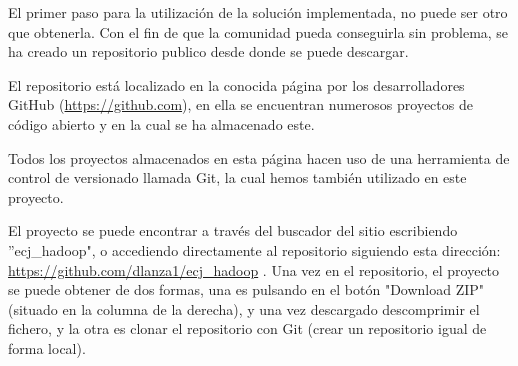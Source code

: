 El primer paso para la utilización de la solución implementada, no puede ser otro que obtenerla. Con el fin de que la comunidad pueda conseguirla sin problema, se ha creado un repositorio publico desde donde se puede descargar.

El repositorio est\'a localizado en la conocida p\'agina por los desarrolladores GitHub (\url{https://github.com}), en ella se encuentran numerosos proyectos de código abierto y en la cual se ha almacenado este.

Todos los proyectos almacenados en esta p\'agina hacen uso de una herramienta de control de versionado llamada Git, la cual hemos también utilizado en este proyecto.


El proyecto se puede encontrar a través del buscador del sitio escribiendo ''ecj\_hadoop", o accediendo directamente al repositorio siguiendo esta dirección: \url{https://github.com/dlanza1/ecj_hadoop} . Una vez en el repositorio, el proyecto se puede obtener de dos formas, una es pulsando en el botón "Download ZIP" (situado en la columna de la derecha), y una vez descargado descomprimir el fichero, y la otra es clonar el repositorio con Git (crear un repositorio igual de forma local).

